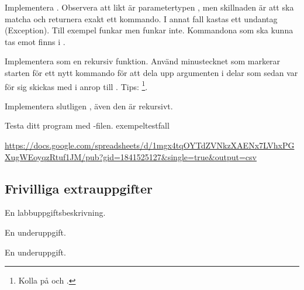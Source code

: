 \Subtask Implementera . Observera att likt  är parametertypen , men skillnaden är att  ska matcha och returnera exakt ett kommando. I annat fall kastas ett undantag (Exception). Till exempel  funkar men  funkar inte. Kommandona som ska kunna tas emot finns i .

\Subtask Implementera  som en rekursiv funktion. Använd minustecknet som markerar starten för ett nytt kommando för att dela upp argumenten  i delar som sedan var för sig skickas med i anrop till . Tips: \footnote{Kolla på  och .}.

\Subtask Implementera slutligen , även den är rekursivt.

\Subtask Testa ditt program med -filen. \TODO exempeltestfall

\url{https://docs.google.com/spreadsheets/d/1mgx4tqOYTdZVNkzXAENx7LVhxPGXugWEoyqzRtuf1JM/pub?gid=1841525127&single=true&output=csv}

\subsection{Frivilliga extrauppgifter}
    
\Task En labbuppgiftsbeskrivning.

\Subtask En underuppgift.

\Subtask En underuppgift.